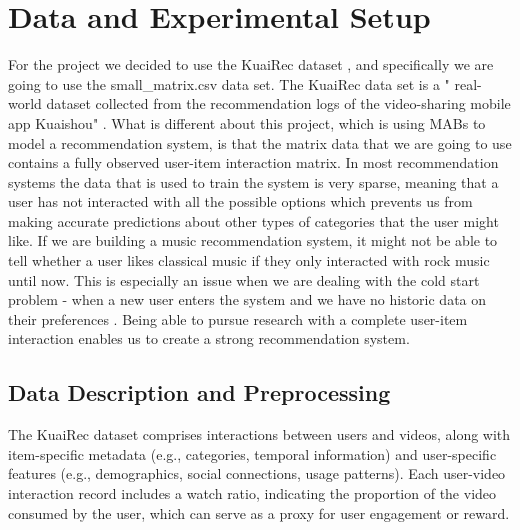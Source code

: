 \section{Data and Experimental Setup}


For the project we decided to use the KuaiRec dataset \cite{gao2022kuairec}, and specifically we are going to use the small\_matrix.csv data set. The KuaiRec data set is a " real-world dataset collected from the recommendation logs of the video-sharing mobile app Kuaishou" \cite{gao2022kuairec}. What is different about this project, which is using MABs to model a recommendation system, is that the matrix data that we are going to use contains a fully observed user-item interaction matrix. In most recommendation systems the data that is used to train the system is very sparse, meaning that a user has not interacted with all the possible options which prevents us from making accurate predictions about other types of categories that the user might like. If we are building a music recommendation system, it might not be able to tell whether a user likes classical music if they only interacted with rock music until now. This is especially an issue when we are dealing with the cold start problem - when a new user enters the system and we have no historic data on their preferences \cite{nath2023_medium}. Being able to pursue research with a complete user-item interaction enables us to create a strong recommendation system.


\subsection{Data Description and Preprocessing}

The KuaiRec dataset comprises interactions between users and videos, along with item-specific metadata (e.g., categories, temporal information) and user-specific features (e.g., demographics, social connections, usage patterns). Each user-video interaction record includes a watch ratio, indicating the proportion of the video consumed by the user, which can serve as a proxy for user engagement or reward.

